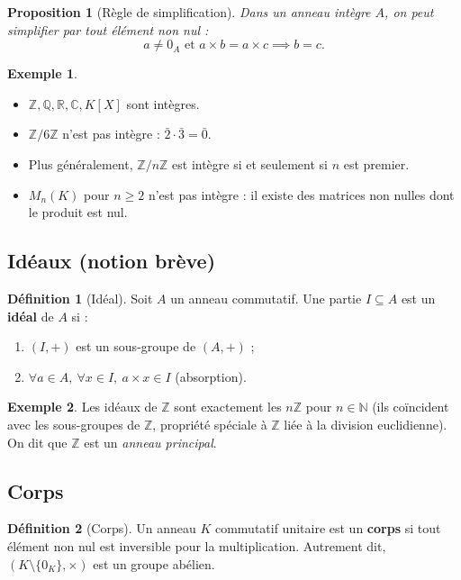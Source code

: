 \documentclass[12pt,a4paper]{report}
\newtheorem{proposition}[theoreme]{Proposition}
\theoremstyle{definition}
\newtheorem{definition}{Définition}[section]
\newtheorem{exemple}{Exemple}[section]
\theoremstyle{remark}
\begin{document}
\begin{proposition}[Règle de simplification]
Dans un anneau intègre $A$, on peut simplifier par tout élément non nul :
\[ a \neq 0_A \text{ et } a \times b = a \times c \implies b = c. \]
\end{proposition}

\begin{exemple}
\begin{itemize}
    \item $\mathbb{Z}, \mathbb{Q}, \mathbb{R}, \mathbb{C}, K[X]$ sont intègres.
    \item $\mathbb{Z}/6\mathbb{Z}$ n'est pas intègre : $\bar{2} \cdot \bar{3} = \bar{0}$.
    \item Plus généralement, $\mathbb{Z}/n\mathbb{Z}$ est intègre si et seulement si $n$ est premier.
    \item $M_n(K)$ pour $n \ge 2$ n'est pas intègre : il existe des matrices non nulles dont le produit est nul.
\end{itemize}
\end{exemple}

\subsection{Idéaux (notion brève)}

\begin{definition}[Idéal]
Soit $A$ un anneau commutatif. Une partie $I \subseteq A$ est un \textbf{idéal} de $A$ si :
\begin{enumerate}
    \item $(I, +)$ est un sous-groupe de $(A, +)$ ;
    \item $\forall a \in A,\ \forall x \in I,\ a \times x \in I$ \quad (absorption).
\end{enumerate}
\end{definition}

\begin{exemple}
Les idéaux de $\mathbb{Z}$ sont exactement les $n\mathbb{Z}$ pour $n \in \mathbb{N}$ (ils coïncident avec les sous-groupes de $\mathbb{Z}$, propriété spéciale à $\mathbb{Z}$ liée à la division euclidienne). On dit que $\mathbb{Z}$ est un \emph{anneau principal}.
\end{exemple}

\subsection{Corps}

\begin{definition}[Corps]
Un anneau $K$ commutatif unitaire est un \textbf{corps} si tout élément non nul est inversible pour la multiplication. Autrement dit, $(K \setminus \{0_K\}, \times)$ est un groupe abélien.
\end{definition}
\end{document}
